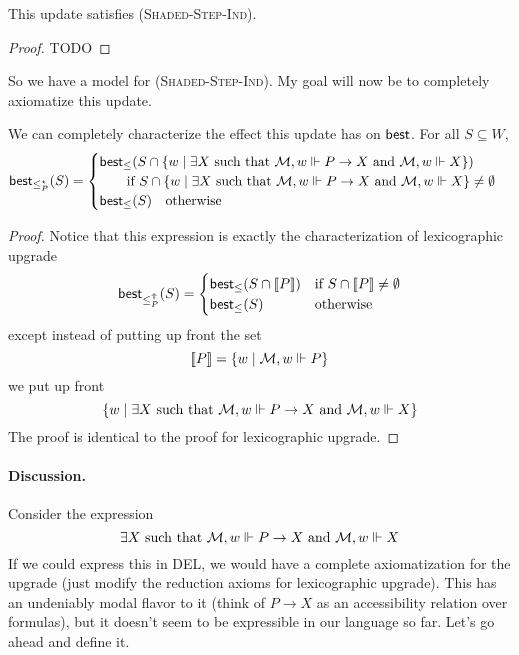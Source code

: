 \documentclass[letterpaper]{article}
\begin{document}
\begin{theorem}
    This update satisfies \textsc{(Shaded-Step-Ind)}.
\end{theorem}
\begin{proof}
    TODO
\end{proof}

So we have a model for \textsc{(Shaded-Step-Ind)}. My goal will now be to completely axiomatize this update.

\begin{proposition}
    We can completely characterize the effect this update has on $\mathsf{best}$.  For all $S \subseteq W$,
    \[
        \mathsf{best}_{\leq^\star_P}(S) =
        \begin{cases}
             \mathsf{best}_\leq(S \cap \{ w \mid \exists X \mbox{ such that } \mathcal{M}, w \Vdash P \to X \mbox{ and } \mathcal{M}, w \Vdash X \})\\
             \quad \quad \mbox{if } S \cap \{ w \mid \exists X \mbox{ such that } \mathcal{M}, w \Vdash P \to X \mbox{ and } \mathcal{M}, w \Vdash X \} \ne \emptyset\\
            \mathsf{best}_\leq(S) \quad \mbox{otherwise}
        \end{cases}
    \]
\end{proposition}
\begin{proof}
    Notice that this expression is exactly the characterization of lexicographic upgrade
    \[  \mathsf{best}_{\leq^\Uparrow_P}(S) = 
        \begin{cases}
            \mathsf{best}_\leq(S \cap [\![\mbox{\em $ P $\/}]\!]) & \mbox{if } S \cap [\![\mbox{\em $ P $\/}]\!] \ne \emptyset\\
            \mathsf{best}_\leq(S) & \mbox{otherwise}
        \end{cases}
    \]
    except instead of putting up front the set
    \[
        [\![\mbox{\em $ P $\/}]\!] = \{ w \mid \mathcal{M}, w \Vdash P \}
    \]
    we put up front
    \[
        \{ w \mid \exists X \mbox{ such that } \mathcal{M}, w \Vdash P \to X \mbox{ and } \mathcal{M}, w \Vdash X \}
    \]
    The proof is identical to the proof for lexicographic upgrade.
\end{proof}

\paragraph*{Discussion.} Consider the expression
\[
    \exists X \mbox{ such that } \mathcal{M}, w \Vdash P \to X \mbox{ and } \mathcal{M}, w \Vdash X
\]
If we could express this in DEL, we would have a complete axiomatization for the upgrade (just modify the reduction axioms for lexicographic upgrade).  This has an undeniably modal flavor to it (think of $P \to X$ as an accessibility relation over formulas), but it doesn't seem to be expressible in our language so far.  Let's go ahead and define it.
\end{document}
